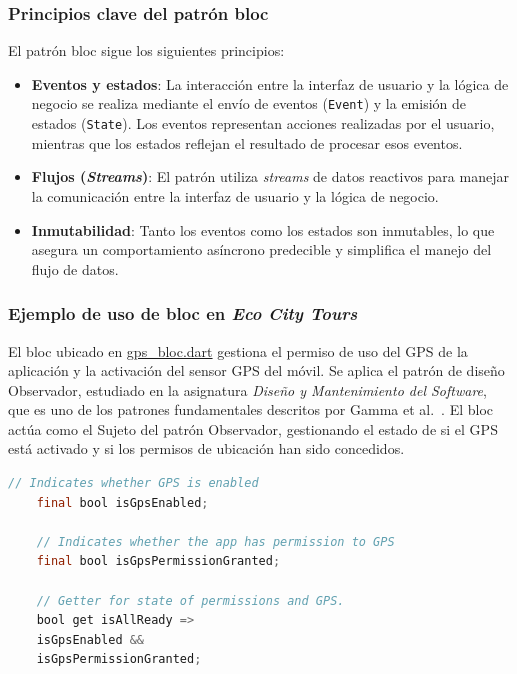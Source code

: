 \subsubsection{Principios clave del patrón \acrshort{bloc}}
	El patrón \acrfull{bloc} sigue los siguientes principios:
	\begin{itemize}
		\item \textbf{Eventos y estados}: La interacción entre la interfaz de usuario y la lógica de negocio se realiza mediante el envío de eventos (\texttt{Event}) y la emisión de estados (\texttt{State}). Los eventos representan acciones realizadas por el usuario, mientras que los estados reflejan el resultado de procesar esos eventos.
		\item \textbf{Flujos (\textit{Streams})}: El patrón utiliza \textit{streams} de datos reactivos para manejar la comunicación entre la interfaz de usuario y la lógica de negocio.
		\item \textbf{Inmutabilidad}: Tanto los eventos como los estados son inmutables, lo que asegura un comportamiento asíncrono predecible y simplifica el manejo del flujo de datos.
	\end{itemize}

\subsubsection{Ejemplo de uso de \acrshort{bloc} en \textit{Eco City Tours}}
El \acrshort{bloc} ubicado en \href{https://github.com/fps1001/TFGII_FPisot/tree/main/project-app/project_app/lib/blocs/gps/gps_bloc.dart}{gps\_bloc.dart} gestiona el permiso de uso del GPS de la aplicación y la activación del sensor GPS del móvil. 
Se aplica el patrón de diseño Observador, estudiado en la asignatura \textit{Diseño y Mantenimiento del Software}, que es uno de los patrones fundamentales descritos por Gamma et al.~\cite{gamma2002}.
El \acrshort{bloc} actúa como el Sujeto del patrón Observador, gestionando el estado de si el GPS está activado y si los permisos de ubicación han sido concedidos.

\begin{lstlisting}[language=Java, captionpos=b, frame=single, basicstyle=\ttfamily\footnotesize, caption={Definición de variables de control en el BLoC}, label={lst:bloc-variables}]
	// Indicates whether GPS is enabled
	final bool isGpsEnabled;
	
	// Indicates whether the app has permission to GPS
	final bool isGpsPermissionGranted;
	
	// Getter for state of permissions and GPS.
	bool get isAllReady =>
	isGpsEnabled &&
	isGpsPermissionGranted;
\end{lstlisting}


